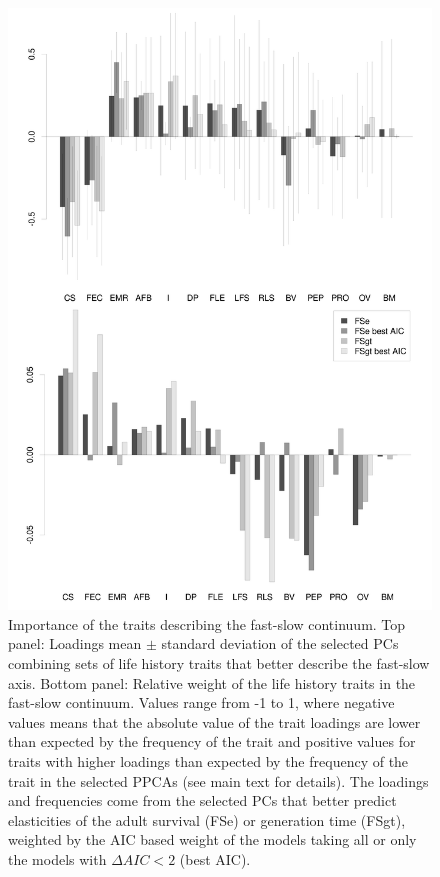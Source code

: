\begin{figure}
\centering
\includegraphics[width=\textwidth]{./Figures/chapter02/fig2-FSaxes.png}
\caption[Fast-Slow PC loadings]{
Importance of the traits describing the fast-slow continuum. Top panel: Loadings 
mean $\pm$ standard deviation of the selected PCs combining sets of life history
traits that better describe the fast-slow axis. Bottom panel: Relative weight
of the life history traits in the fast-slow continuum. Values range from -1 to
1, where negative values means that the absolute value of the trait loadings are
lower than expected by the frequency of the trait and positive values for traits
with higher loadings than expected by the frequency of the trait in the
selected PPCAs (see main text for details). The loadings and frequencies come
from the selected PCs that better predict elasticities of the adult survival
(FSe) or generation time (FSgt), weighted by the AIC based weight of the models
taking all or only the models with $\Delta AIC < 2$ (best AIC).}
\label{fig:fig2.2}
\end{figure}



